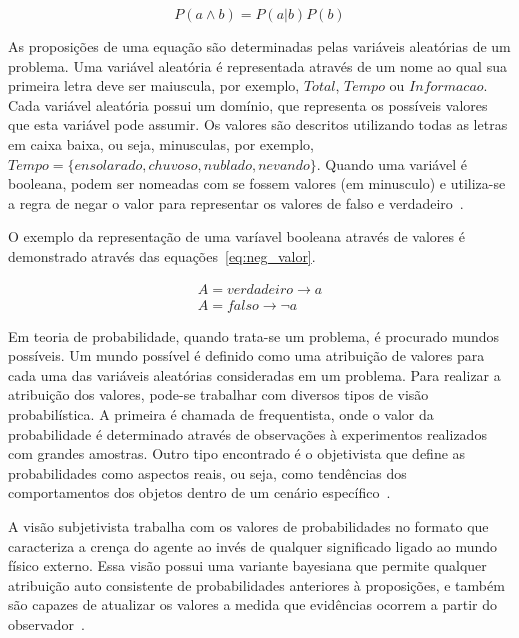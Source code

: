 \begin{equation}
    \label{eq:prob_condicional_a_b_2}
    P(a \land b) = P(a|b)P(b)
\end{equation}

As proposições de uma equação são determinadas pelas variáveis aleatórias de um problema. Uma variável aleatória é representada através de um nome ao qual sua primeira letra deve ser maiuscula, por exemplo, $Total$, $Tempo$ ou $Informacao$. Cada variável aleatória possui um domínio, que representa os possíveis valores que esta variável pode assumir. Os valores são descritos utilizando todas as letras em caixa baixa, ou seja, minusculas, por exemplo, $Tempo = \{ ensolarado, chuvoso, nublado, nevando \}$. Quando uma variável é booleana, podem ser nomeadas com se fossem valores (em minusculo) e utiliza-se a regra de negar o valor para representar os valores de falso e verdadeiro~\cite{russell:2002}.

O exemplo da representação de uma varíavel booleana através de valores é demonstrado através das equações~\ref{eq:neg_valor}.

\begin{subequations}
    \label{eq:neg_valor}
    \begin{align}
        A = verdadeiro \rightarrow a\\
        A = falso \rightarrow \neg a
    \end{align}
\end{subequations}

Em teoria de probabilidade, quando trata-se um problema, é procurado mundos possíveis. Um mundo possível é definido como uma atribuição de valores para cada uma das variáveis aleatórias consideradas em um problema. Para realizar a atribuição dos valores, pode-se trabalhar com diversos tipos de visão probabilística. A primeira é chamada de frequentista, onde o valor da probabilidade é determinado através de observações à experimentos realizados com grandes amostras. Outro tipo encontrado é o objetivista que define as probabilidades como aspectos reais, ou seja, como tendências dos comportamentos dos objetos dentro de um cenário específico~\cite{russell:2002, faceli:2011}.

A visão subjetivista trabalha com os valores de probabilidades no formato que caracteriza a crença do agente ao invés de qualquer significado ligado ao mundo físico externo. Essa visão possui uma variante bayesiana que permite qualquer atribuição auto consistente de probabilidades anteriores à proposições, e também são capazes de atualizar os valores a medida que evidências ocorrem a partir do observador~\cite{russell:2002}.

